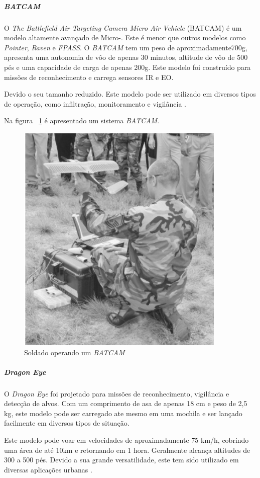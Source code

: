\subparagraph{ \emph{BATCAM}}
O \emph{The Battlefield Air Targeting Camera Micro Air
Vehicle} (BATCAM) é um modelo altamente avançado de Micro-\vant. Este \vant  é menor que outros modelos como \emph{Pointer}, \emph{Raven} e \emph{FPASS}.
O \emph{BATCAM} tem um peso de aproximadamente700g, apresenta uma autonomia de vôo de apenas 30 minutos, altitude de vôo de 500 pés e uma capacidade de carga de
apenas 200g. Este modelo foi construído para missões de reconhecimento e carrega sensores IR e EO.

Devido o seu tamanho reduzido. Este modelo pode ser utilizado em diversos tipos de operação, como infiltração, monitoramento e vigilância \cite{Drew2005}. 


Na figura ~\ref{fig:holding_batcam} é apresentado um sistema \emph{BATCAM}.

\begin{figure}[h!]
\centering
\includegraphics[width=10cm]{pictures/batcam_system.png}
\caption{ Soldado operando um \emph{BATCAM} }
 \label{fig:holding_batcam}
\end{figure}


\subparagraph{ \emph{Dragon Eye}}
O \vant \emph{Dragon Eye} foi projetado para missões de reconhecimento, vigilância e detecção de alvos. Com um comprimento de asa de apenas 18 cm e peso de 2,5 kg, este modelo pode ser carregado ate mesmo em uma mochila e ser lançado facilmente em diversos tipos de situação.

Este modelo pode voar em velocidades de aproximadamente 75 km/h, cobrindo uma área de até 10km e retornando em 1 hora. Geralmente alcança altitudes de 300 a 500 pés.
Devido a sua grande versatilidade, este \vant tem sido utilizado em diversas aplicações urbanas \cite{Drew2005,uav_roadmap2005}.

